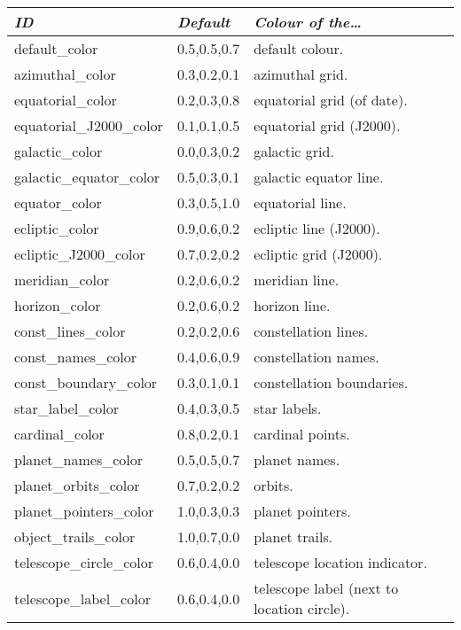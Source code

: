 \begin{longtabu} to \textwidth {l|l|X}
\toprule
\emph{ID} & \emph{Default} & \emph{Colour of the\ldots}\\
\midrule
default\_color           & 0.5,0.5,0.7 & default colour.\\\midrule
azimuthal\_color         & 0.3,0.2,0.1 &  azimuthal grid. \\\midrule
equatorial\_color        & 0.2,0.3,0.8 &  equatorial grid (of date). \\\midrule
equatorial\_J2000\_color & 0.1,0.1,0.5 &  equatorial grid (J2000). \\\midrule
galactic\_color          & 0.0,0.3,0.2 &  galactic grid. \\\midrule
galactic\_equator\_color & 0.5,0.3,0.1 &  galactic equator line. \\\midrule
equator\_color           & 0.3,0.5,1.0 &  equatorial line. \\\midrule
ecliptic\_color          & 0.9,0.6,0.2 &  ecliptic line (J2000). \\\midrule
ecliptic\_J2000\_color   & 0.7,0.2,0.2 &  ecliptic grid (J2000). \\\midrule
meridian\_color          & 0.2,0.6,0.2 &  meridian line. \\\midrule
horizon\_color           & 0.2,0.6,0.2 &  horizon line. \\\midrule
const\_lines\_color      & 0.2,0.2,0.6 &  constellation lines. \\\midrule
const\_names\_color      & 0.4,0.6,0.9 &  constellation names. \\\midrule
const\_boundary\_color   & 0.3,0.1,0.1 &  constellation boundaries. \\\midrule
star\_label\_color       & 0.4,0.3,0.5 &  star labels. \\\midrule
cardinal\_color          & 0.8,0.2,0.1 &  cardinal points. \\\midrule
planet\_names\_color     & 0.5,0.5,0.7 &  planet names. \\\midrule
planet\_orbits\_color    & 0.7,0.2,0.2 &  orbits. \\\midrule
planet\_pointers\_color  & 1.0,0.3,0.3 &  planet pointers. \\\midrule
object\_trails\_color    & 1.0,0.7,0.0 &  planet trails. \\\midrule
telescope\_circle\_color & 0.6,0.4,0.0 &  telescope location indicator. \\\midrule
telescope\_label\_color  & 0.6,0.4,0.0 &  telescope label (next to location circle). \\\midrule

\end{longtabu}
